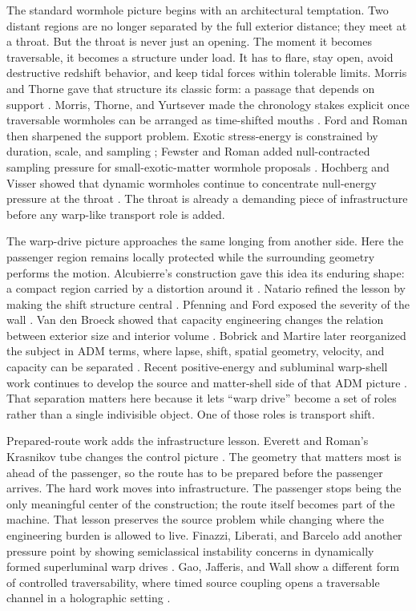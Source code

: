 \documentclass[11pt]{article}
\begin{document}
The standard wormhole picture begins with an architectural temptation. Two distant regions are no longer separated by the full exterior distance; they meet at a throat. But the throat is never just an opening. The moment it becomes traversable, it becomes a structure under load. It has to flare, stay open, avoid destructive redshift behavior, and keep tidal forces within tolerable limits. Morris and Thorne gave that structure its classic form: a passage that depends on support \citep{morris_thorne_1988}. Morris, Thorne, and Yurtsever made the chronology stakes explicit once traversable wormholes can be arranged as time-shifted mouths \citep{morris_thorne_yurtsever_1988}. Ford and Roman then sharpened the support problem. Exotic stress-energy is constrained by duration, scale, and sampling \citep{ford_roman_1996}; Fewster and Roman added null-contracted sampling pressure for small-exotic-matter wormhole proposals \citep{fewster_roman_2005}. Hochberg and Visser showed that dynamic wormholes continue to concentrate null-energy pressure at the throat \citep{hochberg_visser_1998}. The throat is already a demanding piece of infrastructure before any warp-like transport role is added.

The warp-drive picture approaches the same longing from another side. Here the passenger region remains locally protected while the surrounding geometry performs the motion. Alcubierre's construction gave this idea its enduring shape: a compact region carried by a distortion around it \citep{alcubierre_1994}. Natario refined the lesson by making the shift structure central \citep{natario_2002}. Pfenning and Ford exposed the severity of the wall \citep{pfenning_ford_1997}. Van den Broeck showed that capacity engineering changes the relation between exterior size and interior volume \citep{van_den_broeck_1999}. Bobrick and Martire later reorganized the subject in ADM terms, where lapse, shift, spatial geometry, velocity, and capacity can be separated \citep{bobrick_martire_2021}. Recent positive-energy and subluminal warp-shell work continues to develop the source and matter-shell side of that ADM picture \citep{fuchs_2024}. That separation matters here because it lets ``warp drive'' become a set of roles rather than a single indivisible object. One of those roles is transport shift.

Prepared-route work adds the infrastructure lesson. Everett and Roman's Krasnikov tube changes the control picture \citep{everett_roman_1997}. The geometry that matters most is ahead of the passenger, so the route has to be prepared before the passenger arrives. The hard work moves into infrastructure. The passenger stops being the only meaningful center of the construction; the route itself becomes part of the machine. That lesson preserves the source problem while changing where the engineering burden is allowed to live. Finazzi, Liberati, and Barcelo add another pressure point by showing semiclassical instability concerns in dynamically formed superluminal warp drives \citep{finazzi_liberati_barcelo_2009}. Gao, Jafferis, and Wall show a different form of controlled traversability, where timed source coupling opens a traversable channel in a holographic setting \citep{gao_jafferis_wall_2017}.
\end{document}
